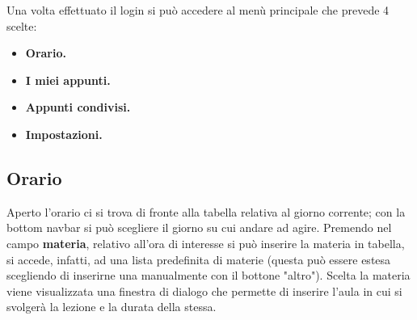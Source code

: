 \documentclass[a4paper, 50pt, twoside]{article}
\begin{document}
Una volta effettuato il login si può accedere al menù principale che prevede 4 scelte:
\begin{itemize}
\item \textbf{Orario.}
\item \textbf{I miei appunti.}
\item \textbf{Appunti condivisi.}
\item \textbf{Impostazioni.}
\end{itemize}

\newpage
\subsection{Orario}
Aperto l'orario ci si trova di fronte alla tabella relativa al giorno corrente; con la bottom navbar si può scegliere il giorno su cui andare ad agire.
Premendo nel campo \textbf{materia}, relativo all'ora di interesse si può inserire la materia in tabella, si accede, infatti, ad una lista predefinita di materie (questa può essere estesa scegliendo di inserirne una manualmente con il bottone "altro"). Scelta la materia viene visualizzata una finestra di dialogo che permette di inserire l'aula in cui si svolgerà la lezione e la durata della stessa.
\end{document}
